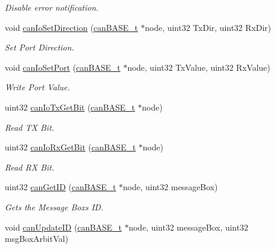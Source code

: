 \begin{DoxyCompactItemize}
\begin{DoxyCompactList}\small\item\em Disable error notification. \end{DoxyCompactList}\item 
void \mbox{\hyperlink{group__CAN_ga2813ca316c5420f49c7045bac182fd01}{can\+Io\+Set\+Direction}} (\mbox{\hyperlink{reg__can_8h_a54ace0879c28a425474845a63d662c05}{can\+B\+A\+S\+E\+\_\+t}} $\ast$node, uint32 Tx\+Dir, uint32 Rx\+Dir)
\begin{DoxyCompactList}\small\item\em Set Port Direction. \end{DoxyCompactList}\item 
void \mbox{\hyperlink{group__CAN_ga1f6f3bbe2bf26e51b6a3c01b7e5d6d4e}{can\+Io\+Set\+Port}} (\mbox{\hyperlink{reg__can_8h_a54ace0879c28a425474845a63d662c05}{can\+B\+A\+S\+E\+\_\+t}} $\ast$node, uint32 Tx\+Value, uint32 Rx\+Value)
\begin{DoxyCompactList}\small\item\em Write Port Value. \end{DoxyCompactList}\item 
uint32 \mbox{\hyperlink{group__CAN_gabb2b7807d43b7208031e1a2f0974ee00}{can\+Io\+Tx\+Get\+Bit}} (\mbox{\hyperlink{reg__can_8h_a54ace0879c28a425474845a63d662c05}{can\+B\+A\+S\+E\+\_\+t}} $\ast$node)
\begin{DoxyCompactList}\small\item\em Read TX Bit. \end{DoxyCompactList}\item 
uint32 \mbox{\hyperlink{group__CAN_ga47e373a708ae421d26dc96f62d150492}{can\+Io\+Rx\+Get\+Bit}} (\mbox{\hyperlink{reg__can_8h_a54ace0879c28a425474845a63d662c05}{can\+B\+A\+S\+E\+\_\+t}} $\ast$node)
\begin{DoxyCompactList}\small\item\em Read RX Bit. \end{DoxyCompactList}\item 
uint32 \mbox{\hyperlink{group__CAN_ga15061ba9ad17a032d93d482a63e5093a}{can\+Get\+ID}} (\mbox{\hyperlink{reg__can_8h_a54ace0879c28a425474845a63d662c05}{can\+B\+A\+S\+E\+\_\+t}} $\ast$node, uint32 message\+Box)
\begin{DoxyCompactList}\small\item\em Gets the Message Box\textquotesingle{}s ID. \end{DoxyCompactList}\item 
void \mbox{\hyperlink{group__CAN_ga6a2ea37d107b5e26bb3f7628ef2c7ee7}{can\+Update\+ID}} (\mbox{\hyperlink{reg__can_8h_a54ace0879c28a425474845a63d662c05}{can\+B\+A\+S\+E\+\_\+t}} $\ast$node, uint32 message\+Box, uint32 msg\+Box\+Arbit\+Val)

\end{DoxyCompactItemize}
